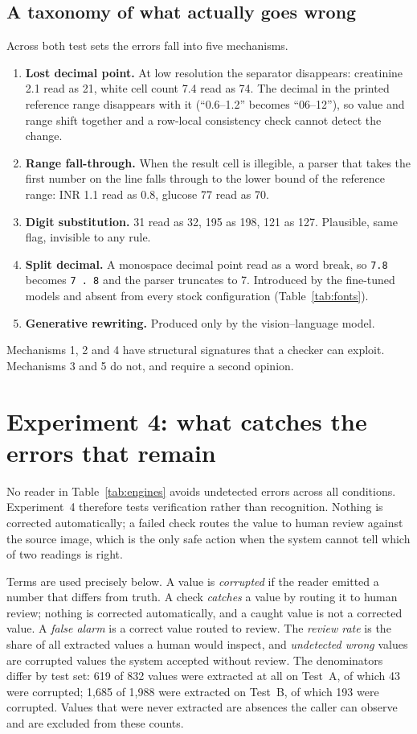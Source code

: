 \documentclass[11pt]{article}
\begin{document}
\subsection{A taxonomy of what actually goes wrong}

Across both test sets the errors fall into five mechanisms.

\begin{enumerate}
\item \textbf{Lost decimal point.} At low resolution the separator disappears: creatinine
2.1 read as 21, white cell count 7.4 read as 74. The decimal in the printed reference range
disappears with it (``0.6--1.2'' becomes ``06--12''), so value and range shift together and a
row-local consistency check cannot detect the change.
\item \textbf{Range fall-through.} When the result cell is illegible, a parser that takes the
first number on the line falls through to the lower bound of the reference range: INR 1.1 read
as 0.8, glucose 77 read as 70.
\item \textbf{Digit substitution.} 31 read as 32, 195 as 198, 121 as 127. Plausible, same flag,
invisible to any rule.
\item \textbf{Split decimal.} A monospace decimal point read as a word break, so
\texttt{7.8} becomes \texttt{7 . 8} and the parser truncates to 7. Introduced by the
fine-tuned models and absent from every stock configuration (Table~\ref{tab:fonts}).
\item \textbf{Generative rewriting.} Produced only by the vision--language model.
\end{enumerate}

Mechanisms 1, 2 and 4 have structural signatures that a checker can exploit. Mechanisms 3 and 5
do not, and require a second opinion.

\section{Experiment 4: what catches the errors that remain}

No reader in Table~\ref{tab:engines} avoids undetected errors across all conditions.
Experiment~4 therefore tests
verification rather than recognition. Nothing is corrected automatically; a failed check routes
the value to human review against the source image, which is the only safe action when the
system cannot tell which of two readings is right.

Terms are used precisely below. A value is \emph{corrupted} if the reader emitted a number that
differs from truth. A check \emph{catches} a value by routing it to human review; nothing is
corrected automatically, and a caught value is not a corrected value. A \emph{false alarm} is a
correct value routed to review. The \emph{review rate} is the share of all extracted values a
human would inspect, and \emph{undetected wrong} values are corrupted values the system accepted
without review. The denominators differ by test set: 619 of 832 values were extracted at all on
Test~A, of which 43 were corrupted; 1{,}685 of 1{,}988 were extracted on Test~B, of which 193
were corrupted. Values that were never extracted are absences the caller can observe and are
excluded from these counts.
\end{document}
